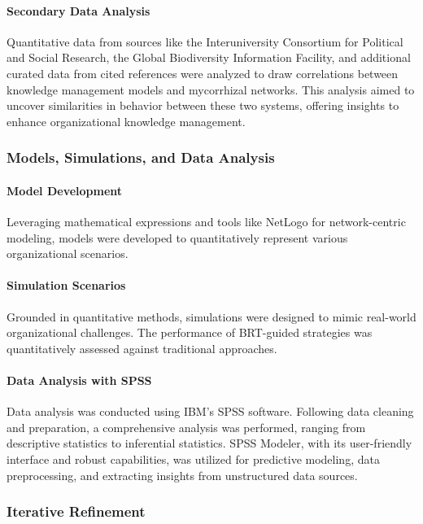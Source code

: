 \documentclass[sn-nature]{sn-jnl}%
\theoremstyle{thmstyleone}%
\theoremstyle{thmstyletwo}%
\theoremstyle{thmstylethree}%
\begin{document}
\paragraph{Secondary Data Analysis} Quantitative data from sources like the Interuniversity Consortium for Political and Social Research, the Global Biodiversity Information Facility, and additional curated data from cited references were analyzed to draw correlations between knowledge management models and mycorrhizal networks. This analysis aimed to uncover similarities in behavior between these two systems, offering insights to enhance organizational knowledge management.

\subsubsection{Models, Simulations, and Data Analysis}

\paragraph{Model Development} Leveraging mathematical expressions and tools like NetLogo for network-centric modeling, models were developed to quantitatively represent various organizational scenarios.

\paragraph{Simulation Scenarios} Grounded in quantitative methods, simulations were designed to mimic real-world organizational challenges. The performance of BRT-guided strategies was quantitatively assessed against traditional approaches.

\paragraph{Data Analysis with SPSS} Data analysis was conducted using IBM’s SPSS software. Following data cleaning and preparation, a comprehensive analysis was performed, ranging from descriptive statistics to inferential statistics. SPSS Modeler, with its user-friendly interface and robust capabilities, was utilized for predictive modeling, data preprocessing, and extracting insights from unstructured data sources.

\subsubsection{Iterative Refinement}
\end{document}
